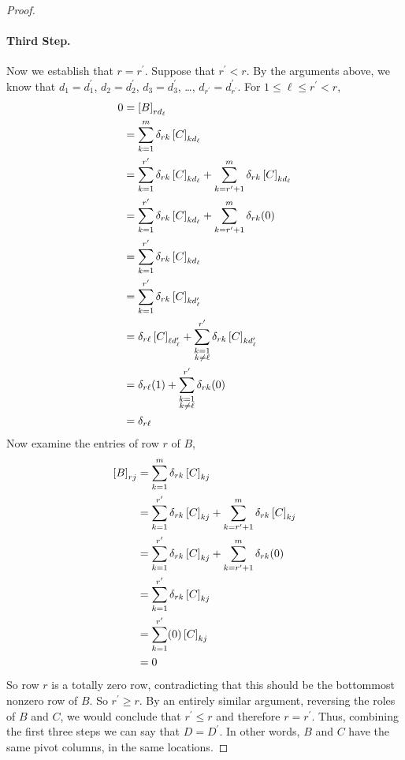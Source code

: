 \documentclass{ximera}
\begin{document}
\begin{theorem}
\begin{proof}
\paragraph*{Third Step.}  Now we establish that $r=r^\prime$.  Suppose that $r^\prime<r$.  By the arguments above, we know that $d_1=d^\prime_1$, $d_2=d^\prime_2$, $d_3=d^\prime_3$, \ldots, $d_{r^\prime}=d^\prime_{r^\prime}$.   For $1\leq\ell\leq r^\prime<r$,
\begin{align*}
0
&=\left\lbrack B\right\rbrack_{rd_\ell}
\\
&=\sum_{k=1}^{m}\delta_{rk}\left\lbrack C\right\rbrack_{kd_\ell}\\
&=
\sum_{k=1}^{r^\prime}\delta_{rk}\left\lbrack C\right\rbrack_{kd_\ell}
+
\sum_{k=r^\prime+1}^{m}\delta_{rk}\left\lbrack C\right\rbrack_{kd_\ell}
\\
&=
\sum_{k=1}^{r^\prime}\delta_{rk}\left\lbrack C\right\rbrack_{kd_\ell}
+
\sum_{k=r^\prime+1}^{m}\delta_{rk}(0)
\\
&=\sum_{k=1}^{r^\prime}\delta_{rk}\left\lbrack C\right\rbrack_{kd_\ell}\\
&=\sum_{k=1}^{r^\prime}\delta_{rk}\left\lbrack C\right\rbrack_{kd^\prime_\ell}\\
&=
\delta_{r\ell}\left\lbrack C\right\rbrack_{\ell d^\prime_\ell}
+
\sum_{\substack{k=1\\k\neq\ell}}^{r^\prime}\delta_{rk}\left\lbrack C\right\rbrack_{kd^\prime_\ell}
\\
&=
\delta_{r\ell}(1)
+
\sum_{\substack{k=1\\k\neq\ell}}^{r^\prime}\delta_{rk}(0)
\\
&=\delta_{r\ell}
\end{align*}
Now examine the entries of row $r$ of $B$,
\begin{align*}
\left\lbrack B\right\rbrack_{rj}
&=\sum_{k=1}^{m}\delta_{rk}\left\lbrack C\right\rbrack_{kj}\\
&=
\sum_{k=1}^{r^\prime}\delta_{rk}\left\lbrack C\right\rbrack_{kj}
+
\sum_{k=r^\prime+1}^{m}\delta_{rk}\left\lbrack C\right\rbrack_{kj}
\\
&=
\sum_{k=1}^{r^\prime}\delta_{rk}\left\lbrack C\right\rbrack_{kj}
+
\sum_{k=r^\prime+1}^{m}\delta_{rk}(0)
\\
&=\sum_{k=1}^{r^\prime}\delta_{rk}\left\lbrack C\right\rbrack_{kj}\\
&=\sum_{k=1}^{r^\prime}(0)\left\lbrack C\right\rbrack_{kj}\\
&=0
\end{align*}
So row $r$ is a totally zero row, contradicting that this should be the bottommost nonzero row of $B$.  So $r^\prime\geq r$.  By an entirely similar argument, reversing the roles of $B$ and $C$, we would conclude that $r^\prime\leq r$ and therefore $r=r^\prime$.  Thus, combining the first three steps we can say that $D=D^\prime$.  In other words, $B$ and $C$ have the same pivot columns, in the same locations.


\end{proof}
\end{theorem}
\end{document}
